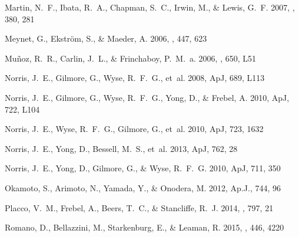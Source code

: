\documentclass[]{emulateapj}
\begin{document}
\begin{thebibliography}{67}
{Martin}, N.~F., {Ibata}, R.~A., {Chapman}, S.~C., {Irwin}, M., \& {Lewis},
  G.~F. 2007, \mnras, 380, 281

{Meynet}, G., {Ekstr{\"o}m}, S., \& {Maeder}, A. 2006, \aap, 447, 623

{Mu{\~n}oz}, R.~R., {Carlin}, J.~L., \& {Frinchaboy}, P.~M.~a. 2006, \apjl,
  650, L51

{Norris}, J.~E., {Gilmore}, G., {Wyse}, R.~F.~G.,  {et~al.} 2008, ApJ, 689,
  L113

{Norris}, J.~E., {Gilmore}, G., {Wyse}, R.~F.~G., {Yong}, D., \& {Frebel}, A.
  2010{}, ApJ, 722, L104

{Norris}, J.~E., {Wyse}, R.~F.~G., {Gilmore}, G.,  {et~al.} 2010{},
  ApJ, 723, 1632

{Norris}, J.~E., {Yong}, D., {Bessell}, M.~S.,  {et~al.} 2013, ApJ, 762, 28

{Norris}, J.~E., {Yong}, D., {Gilmore}, G., \& {Wyse}, R.~F.~G.
  2010{}, ApJ, 711, 350

{Okamoto}, S., {Arimoto}, N., {Yamada}, Y., \& {Onodera}, M. 2012, Ap.J., 744,
  96

{Placco}, V.~M., {Frebel}, A., {Beers}, T.~C., \& {Stancliffe}, R.~J. 2014,
  \apj, 797, 21

{Romano}, D., {Bellazzini}, M., {Starkenburg}, E., \& {Leaman}, R. 2015,
  \mnras, 446, 4220


\end{thebibliography}
\end{document}
